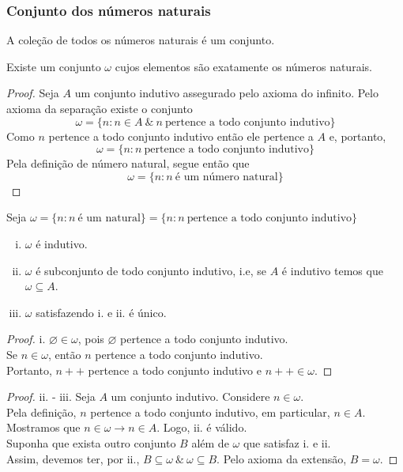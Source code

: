       \subsubsection{Conjunto dos números naturais}
         A coleção de todos os números naturais é um conjunto.
         \begin{theorem}
            Existe um conjunto $\omega$ cujos elementos são exatamente os números naturais.
            \begin{proof}
               Seja $A$ um conjunto indutivo assegurado pelo axioma do infinito.
               Pelo axioma da separação existe o conjunto
               $$\omega = \{n:n \in A\ \&\ n\ \textrm{pertence a todo conjunto indutivo}\}$$
               Como $n$ pertence a todo conjunto indutivo então ele pertence a $A$ e, portanto,
               $$\omega = \{n: n\ \textrm{pertence a todo conjunto indutivo}\}$$
               Pela definição de número natural, segue então que
               $$\omega = \{n: n\ \textrm{é um número natural}\}$$
            \end{proof}
         \end{theorem}
         \begin{theorem}
            Seja $\omega = \{n: n\ \textrm{é um natural}\} = 
            \{n: n\ \textrm{pertence a todo conjunto indutivo}\}$
            \begin{enumerate}[i.]
               \item $\omega$ é indutivo.
               \item $\omega$ é subconjunto de todo conjunto indutivo,
                  i.e, se $A$ é indutivo temos que $\omega \subseteq A$.
               \item $\omega$ satisfazendo i. e ii. é único.
            \end{enumerate}
            \begin{proof}
                i. $\varnothing \in \omega$, pois $\varnothing$ pertence a 
                todo conjunto indutivo.\\
                Se $n \in \omega$, então $n$ pertence a todo conjunto indutivo.\\
                Portanto, $n++$ pertence a todo conjunto indutivo e $n++ \in \omega$.
            \end{proof}
            \begin{proof}
                ii. - iii. Seja $A$ um conjunto indutivo. Considere $n\in \omega$.\\
                Pela definição, $n$ pertence a todo conjunto indutivo, em particular, $n \in A$.\\
                Mostramos que $n \in \omega \rightarrow n \in A$. Logo, ii. é válido.\\
                Suponha que exista outro conjunto $B$ além de $\omega$ que satisfaz i. e ii.\\
                Assim, devemos ter, por ii., $B\subseteq \omega\ \&\ \omega \subseteq B$. 
                Pelo axioma da extensão, $B = \omega$.
            \end{proof}
         \end{theorem}
